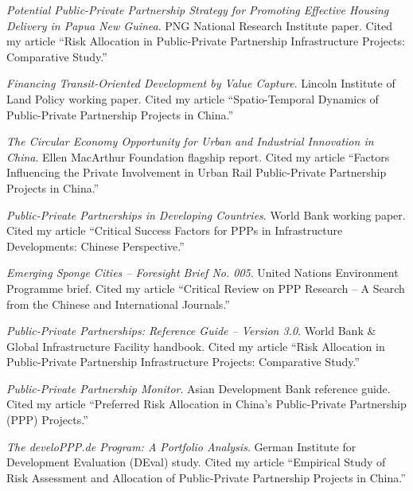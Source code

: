 \documentclass[11pt,a4paper]{report} %
\begin{document}
\begin{tablist}
        \item[2019] \tab{}\textit{Potential Public-Private Partnership Strategy for Promoting Effective Housing Delivery in Papua New Guinea}. PNG National Research Institute paper. Cited my article “Risk Allocation in Public-Private Partnership Infrastructure Projects: Comparative Study.”  
    
        \item[2019] \tab{}\textit{Financing Transit-Oriented Development by Value Capture}. Lincoln Institute of Land Policy working paper. Cited my article “Spatio-Temporal Dynamics of Public-Private Partnership Projects in China.”  
    
        \item[2018] \tab{}\textit{The Circular Economy Opportunity for Urban and Industrial Innovation in China}. Ellen MacArthur Foundation flagship report. Cited my article “Factors Influencing the Private Involvement in Urban Rail Public-Private Partnership Projects in China.”  

        \item[2018] \tab{}\textit{Public-Private Partnerships in Developing Countries}. World Bank working paper. Cited my article “Critical Success Factors for PPPs in Infrastructure Developments: Chinese Perspective.”  
    
        \item[2018] \tab{}\textit{Emerging Sponge Cities -- Foresight Brief No. 005}. United Nations Environment Programme brief. Cited my article “Critical Review on PPP Research -- A Search from the Chinese and International Journals.”  
    
        \item[2017] \tab{}\textit{Public-Private Partnerships: Reference Guide -- Version 3.0}. World Bank \& Global Infrastructure Facility handbook. Cited my article “Risk Allocation in Public-Private Partnership Infrastructure Projects: Comparative Study.”  
    
        \item[2017] \tab{}\textit{Public-Private Partnership Monitor}. Asian Development Bank reference guide. Cited my article “Preferred Risk Allocation in China's Public-Private Partnership (PPP) Projects.”  
    
        \item[2016] \tab{}\textit{The develoPPP.de Program: A Portfolio Analysis}. German Institute for Development Evaluation (DEval) study. Cited my article “Empirical Study of Risk Assessment and Allocation of Public-Private Partnership Projects in China.”  
    

\end{tablist}
\end{document}

